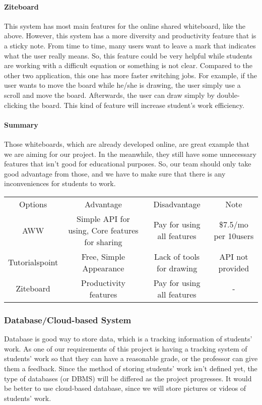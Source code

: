 \documentclass[10pt]{article}
\begin{document}
            \paragraph{Ziteboard}
                This system has most main features for the online shared whiteboard, like the above. However, this system has a more diversity and productivity feature that is a sticky note. From time to time, many users want to leave a mark that indicates what the user really means. So, this feature could be very helpful while students are working with a difficult equation or something is not clear. Compared to the other two application, this one has more faster switching jobs. For example, if the user wants to move the board while he/she is drawing, the user simply use a scroll and move the board. Afterwards, the user can draw simply by double-clicking the board. This kind of feature will increase student’s work efficiency. \cite{Zite}

            \paragraph{Summary}
                Those whiteboards, which are already developed online, are great example that we are aiming for our project. In the meanwhile, they still have some unnecessary features that isn’t good for educational purposes. So, our team should only take good advantage from those, and we have to make sure that there is any inconveniences for students to work.

                \begin{center}
                \begin{tabular}{ |c|c|c|c| } \hline
                     Options & Advantage & Disadvantage & Note \\
                     AWW & Simple API for using, Core features for sharing & Pay for using all features & \$7.5/mo per 10users  \\
                     Tutorialspoint & Free, Simple Appearance & Lack of tools for drawing & API not provided\\
                     Ziteboard & Productivity features & Pay for using all features & -\\
                     \hline
                \end{tabular}
                \end{center}

        \subsubsection{Database/Cloud-based System}
            Database is good way to store data, which is a tracking information of students’ work. As one of our requirements of this project is having a tracking system of students’ work so that they can have a reasonable grade, or the professor can give them a feedback. Since the method of storing students’ work isn’t defined yet, the type of databases (or DBMS) will be differed as the project progresses. It would be better to use cloud-based database, since we will store pictures or videos of students’ work.
\end{document}
